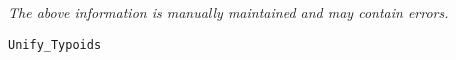 \label{pkg:unify\_typoids}

{\tiny \it The above information is manually maintained and may contain errors.}
\begin{verbatim}
Unify_Typoids
\end{verbatim}
